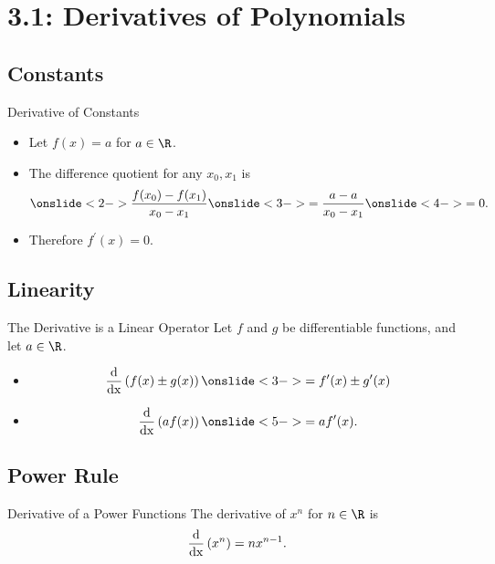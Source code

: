 \documentclass[Lecture.tex]{subfiles}
\begin{document}
\section{3.1: Derivatives of Polynomials}
\subsection{Constants}
\begin{frame}{Derivative of Constants}
  \begin{itemize}
  \item<1->
    Let $f(x) = a$ for $a \in \R$.
  \item<2->
    The difference quotient for any $x_0, x_1$ is
    $$\onslide<2->{\frac{f(x_0) - f(x_1)}{x_0 - x_1}}\onslide<3->{= \frac{a - a }{x_0 - x_1}}\onslide<4->{ = 0.}$$
  \item<5->
    Therefore $f^\prime(x) = 0$.
  \end{itemize}
\end{frame}

\subsection{Linearity}
\begin{frame}{The Derivative is a Linear Operator}
  Let $f$ and $g$ be differentiable functions, and let $a \in \R$.
  \begin{itemize}
  \item<2->
    $$\frac{\operatorname{d}}{\operatorname{dx}}\left(f(x) \pm g(x)\right) \onslide<3->{= f^\prime(x) \pm g^\prime(x)}$$
  \item<4->
    $$\frac{\operatorname{d}}{\operatorname{dx}}\left(af(x)\right) \onslide<5->{= af^\prime(x)}.$$
  \end{itemize}
\end{frame}

\subsection{Power Rule}

\begin{frame}{Derivative of a Power Functions}
  The derivative of $x^n$ for $n \in \R$ is 
  $$\frac{\operatorname{d}}{\operatorname{dx}}\left(x^n\right) = nx^{n-1}.$$

\end{frame}
\end{document}
